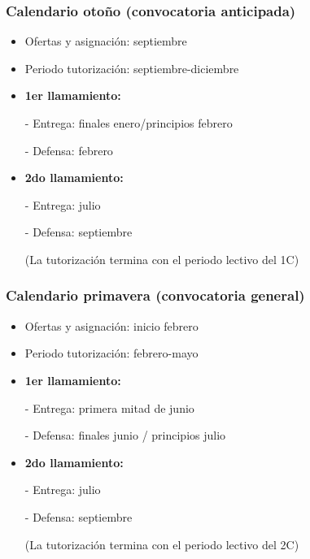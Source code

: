 \documentclass[utf8, xcolor=dvipsnames]{beamer}
\begin{document}
\begin{frame}
\frametitle{Calendario otoño (convocatoria anticipada)}
\centering

\begin{itemize}
  \item Ofertas y asignación: septiembre
  \item Periodo tutorización: septiembre-diciembre
  \item[]
  \item \textbf{1er llamamiento:}
  \item[-] Entrega: finales enero/principios febrero
  \item[-] Defensa: febrero
  \item[]
  \item \textbf{2do llamamiento:}
  \item[-] Entrega: julio
  \item[-] Defensa: septiembre
  \item[] (La tutorización termina con el periodo lectivo del 1C)
\end{itemize}

\end{frame}

\begin{frame}
\frametitle{Calendario primavera (convocatoria general)}
\centering

\begin{itemize}
  \item Ofertas y asignación: inicio febrero
  \item Periodo tutorización: febrero-mayo
  \item[]
  \item \textbf{1er llamamiento:}
  \item[-] Entrega: primera mitad de junio
  \item[-] Defensa: finales junio / principios julio
  \item[]
  \item \textbf{2do llamamiento:}
  \item[-] Entrega: julio
  \item[-] Defensa: septiembre
  \item[] (La tutorización termina con el periodo lectivo del 2C)
\end{itemize}

\end{frame}
\end{document}
